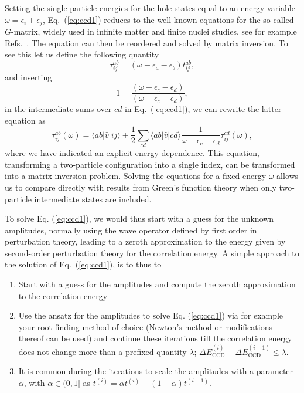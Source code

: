   Setting the single-particle energies for the hole states equal to an
  energy variable $\omega = \epsilon_i+\epsilon_j$,
  Eq.~(\ref{eq:ccd1}) reduces to the well-known equations for the
  so-called $G$-matrix, widely used in infinite matter and finite
  nuclei studies, see for example Refs.~\cite{day1967,hh2000}.  The equation can then be reordered
  and solved by matrix inversion.  To see this let us define the
  following quantity
  \[
  \tau_{ij}^{ab}=
  \left(\omega-\epsilon_a-\epsilon_b\right)t_{ij}^{ab},
  \]
  and inserting
  \[
  1=\frac{\left(\omega-\epsilon_c-\epsilon_d\right)}{\left(\omega-\epsilon_c-\epsilon_d\right)},
  \]
  in the intermediate sums over $cd$ in Eq.~(\ref{eq:ccd1}), we can
  rewrite the latter equation as
  \[
  \tau_{ij}^{ab}(\omega)= \langle ab \vert \hat{v} \vert ij \rangle +
  \frac{1}{2}\sum_{cd} \langle ab \vert \hat{v} \vert cd \rangle
  \frac{1}{\omega-\epsilon_c-\epsilon_d}\tau_{ij}^{cd}(\omega),
  \]
  where we have indicated an explicit energy dependence. This
  equation, transforming a two-particle configuration into a single
  index, can be transformed into a matrix inversion problem.  Solving
  the equations for a fixed energy $\omega$ allows us to compare
  directly with results from Green's function theory when only
  two-particle intermediate states are included.

  To solve Eq. (\ref{eq:ccd1}), we would thus start with a guess for
  the unknown amplitudes, normally using the wave operator defined by
  first order in perturbation theory, leading to a zeroth
  approximation to the energy given by second-order perturbation
  theory for the correlation energy.  A simple approach to the
  solution of Eq.~(\ref{eq:ccd1}), is to thus to
  \begin{enumerate}
  \item Start with a guess for the amplitudes and compute the zeroth
    approximation to the correlation energy

  \item Use the ansatz for the amplitudes to solve Eq. (\ref{eq:ccd1})
    via for example your root-finding method of choice (Newton's
    method or modifications thereof can be used) and continue these
    iterations till the correlation energy does not change more than a
    prefixed quantity $\lambda$; $\Delta E_{\mathrm{CCD}}^{(i)}-\Delta
    E_{\mathrm{CCD}}^{(i-1)} \le \lambda$.

  \item It is common during the iterations to scale the amplitudes
    with a parameter $\alpha$, with $\alpha \in (0,1]$ as
      $t^{(i)}=\alpha t^{(i)}+(1-\alpha)t^{(i-1)}$.
  \end{enumerate}

